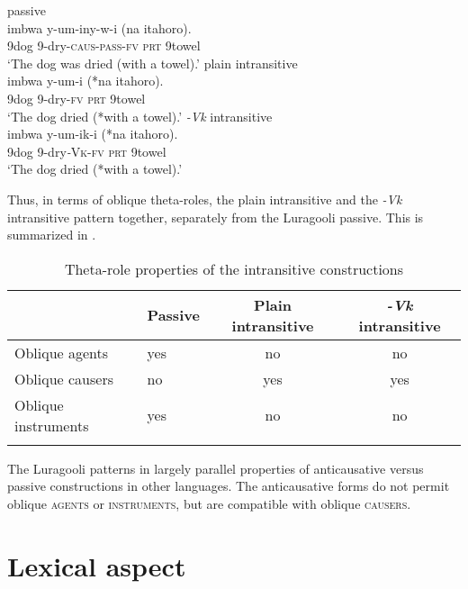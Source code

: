 \documentclass[output=paper]{langsci/lanmgscibook}
\begin{document}
\ea\label{ex:gluckman:9}
  \ea \label{ex:gluckman:9a} 
  {{passive}}\\
  \gll imbwa y-um-iny-w-i            (na    itahoro).\\
      9dog 9-dry-\textsc{caus}-\textsc{pass}-\textsc{fv}   \textsc{prt}  9towel\\
  \glt ‘The dog was dried (with a towel).’
  \ex\label{ex:gluckman:9b} 
  {{plain intransitive}}\\
  \gll imbwa y-um-i          (*na   itahoro).\\
      9dog   9-dry-\textsc{fv}         \hphantom{(*}\textsc{prt} 9towel\\
  \glt ‘The dog dried (*with a towel).’
  \ex\label{ex:gluckman:9c}
  {{\textit{-Vk}}{ intransitive}}\\
  \gll imbwa  y-um-ik-i      (*na  itahoro).\\
      9dog    9-dry\textit{-}\textsc{Vk}-\textsc{fv} \hphantom{(*}\textsc{prt} 9towel\\
  \glt ‘The dog dried (*with a towel).’
  \z
\z

Thus, in terms of oblique theta-roles, the plain intransitive and the \textit{-Vk} intransitive pattern together, separately from the Luragooli passive. This is summarized in .

\begin{table}
\caption{Theta-role properties of the intransitive constructions}
\label{tab:gluckman:2}

\begin{tabularx}{\textwidth}{llCC}
\lsptoprule
 & {Passive} & {Plain intransitive} & {\textit{-Vk}} {intransitive}\\
\midrule
{Oblique agents} & yes & no & no\\
{Oblique causers} & no & yes & yes\\
{Oblique instruments} & yes & no & no\\
\lspbottomrule
\end{tabularx}
\end{table}

The Luragooli patterns in  largely parallel properties of anticausative versus passive constructions in other languages. The anticausative forms do not permit oblique \textsc{agents} or \textsc{instruments}, but are compatible with oblique \textsc{causers.}

\section{Lexical aspect}\label{sec:gluckman:4}
\end{document}
